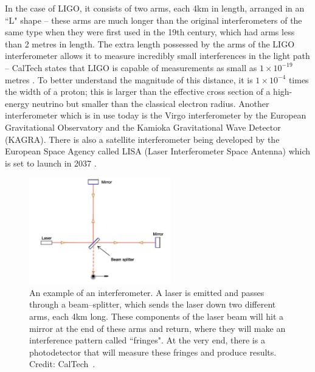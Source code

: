 In the case of LIGO, it consists of two arms, each 4km in length, arranged in an ``L" shape -- these arms are much longer than the original interferometers of the same type when they were first used in the 19th century, which had arms less than 2 metres in length.
The extra length possessed by the arms of the LIGO interferometer allows it to measure incredibly small interferences in the light path -- CalTech states that LIGO is capable of measurements as small as $1\times10^{-19}$ metres \cite{LIGOSummary}.
To better understand the magnitude of this distance, it is $1\times10^{-4}$ times the width of a proton; this is larger than the effective cross section of a high-energy neutrino but smaller than the classical electron radius.
Another interferometer which is in use today is the Virgo interferometer by the European Gravitational Observatory and the Kamioka Gravitational Wave Detector (KAGRA).
There is also a satellite interferometer being developed by the European Space Agency called LISA (Laser Interferometer Space Antenna) which is set to launch in 2037 \cite{LISASummary}.

\begin{figure}
    \centering
    \includegraphics[width=0.55\textwidth]{images/Basic_michelson_labeled.pdf}
    \caption[An example of an interferometer]{An example of an interferometer. A laser is emitted and passes through a beam--splitter, which sends the laser down two different arms, each 4km long. These components of the laser beam will hit a mirror at the end of these arms and return, where they will make an interference pattern called ``fringes". At the very end, there is a photodetector that will measure these fringes and produce results. Credit: CalTech~\cite{LIGOSummary}.}
    \label{fig:interferometerExample}
\end{figure}

